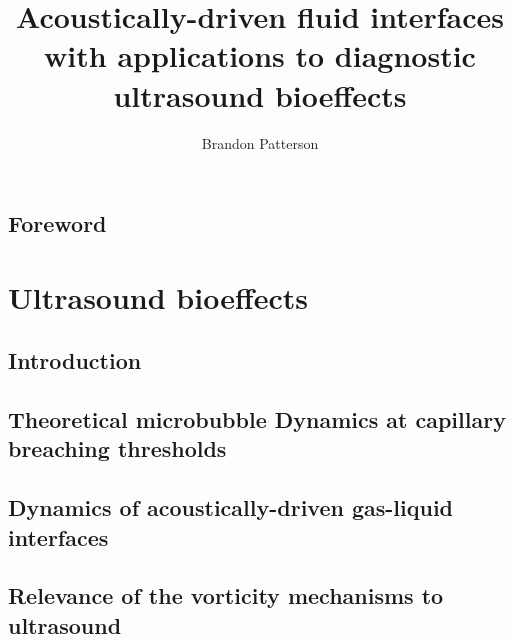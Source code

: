 \documentclass{./tex/thesis-umich}
\title{Acoustically-driven fluid interfaces with applications to diagnostic ultrasound bioeffects}
\author{Brandon Patterson}
\begin{document}
\chapter*{Foreword} \label{ch:foreword}



%
\acresetall

\part{Ultrasound bioeffects} \label{part:ultrasound_bioeffects}
%


\chapter{Introduction} \label{ch:Introduction}

% 

\chapter{Theoretical microbubble Dynamics at capillary breaching thresholds}   \label{ch:usbe_bubble}%
%
%

\acresetall


\chapter{Dynamics of acoustically-driven gas-liquid interfaces} \label{ch:usbe_lung}%
 \acresetall



%



%

\acresetall
\chapter{Relevance of the vorticity mechanisms to ultrasound} \label{ch:usbe_lung_bio}%

\end{document}
